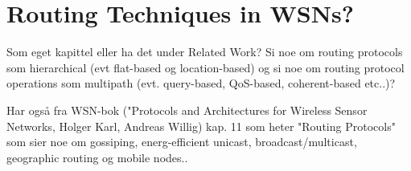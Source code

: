 \documentclass[USenglish]{uit-thesis}
\newcommand{\definition}[1]{%
  \refstepcounter{definition}%
  \par\noindent\textbf{The Definition~\thedefinition. #1}%
  \addcontentsline{def}{definition}
    {\protect\numberline{\thechapter.\thedefinition}#1}\par%
}
\begin{document}









\chapter{Routing Techniques in WSNs?}
Som eget kapittel eller ha det under Related Work? Si noe om routing protocols som hierarchical (evt flat-based og location-based) og si noe om routing protocol operations som multipath (evt. query-based, QoS-based, coherent-based etc..)?

Har også fra WSN-bok ("Protocols and Architectures for Wireless Sensor Networks, Holger Karl, Andreas Willig) kap. 11 som heter "Routing Protocols" som sier noe om gossiping, energ-efficient unicast, broadcast/multicast, geographic routing og mobile nodes..





\end{document}
